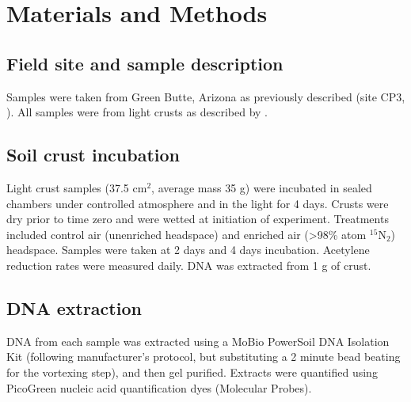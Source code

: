 \section{Materials and Methods}
\subsection{Field site and sample description}
Samples were taken from Green Butte, Arizona as previously described (site CP3,
\citet{BERALDI_CAMPESI_2009}). All samples were from light crusts as described
by \cite{15643930}.

\subsection{Soil crust incubation}
Light crust samples (37.5 cm$^{2}$, average mass 35 g) were incubated in sealed
chambers under controlled atmosphere and in the light for 4 days. Crusts were
dry prior to time zero and were wetted at initiation of experiment. Treatments
included control air (unenriched headspace) and enriched air (\textgreater98\%
atom $^{15}$N$_{2}$) headspace. Samples were taken at 2 days and 4 days
incubation.  Acetylene reduction rates were measured daily. DNA was extracted
from 1 g of crust.

\subsection{DNA extraction}
DNA from each sample was extracted using a MoBio PowerSoil DNA Isolation Kit (following manufacturer’s protocol, but substituting a 2 minute bead beating for the vortexing step), and then gel purified. Extracts were quantified using PicoGreen nucleic acid quantification dyes (Molecular Probes). 
